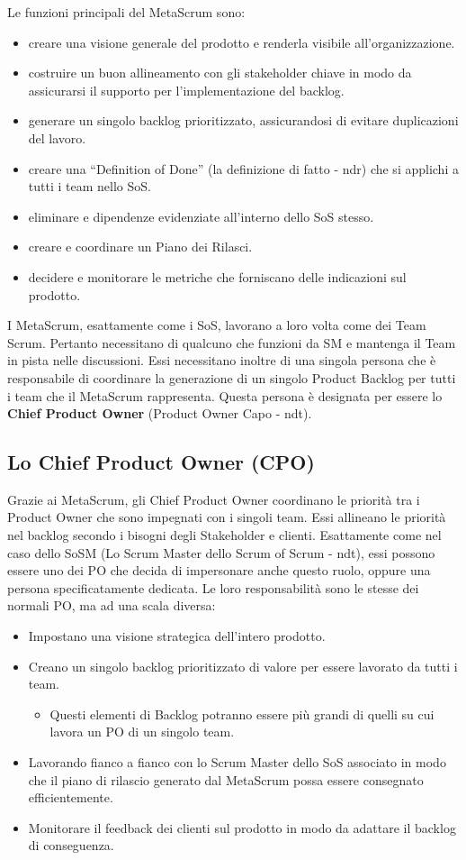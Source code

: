 \documentclass[12pt,a4paper,parskip=full]{scrartcl}
\begin{document}
Le funzioni principali del MetaScrum sono:
\begin{itemize}
\item creare una visione generale del prodotto e renderla visibile all'organizzazione.
\item costruire un buon allineamento con gli stakeholder chiave in modo da assicurarsi il supporto per l'implementazione del backlog.
\item generare un singolo backlog prioritizzato, assicurandosi di evitare duplicazioni del lavoro.
\item creare una ``Definition of Done'' (la definizione di fatto - ndr) che si applichi a tutti i team nello SoS.
\item eliminare e dipendenze evidenziate all'interno dello SoS stesso.
\item creare e coordinare un Piano dei Rilasci.
\item decidere e monitorare le metriche che forniscano delle indicazioni sul prodotto.
\end{itemize}
I MetaScrum, esattamente come i SoS, lavorano a loro volta come dei Team Scrum. Pertanto necessitano di qualcuno che funzioni da SM e mantenga il Team in pista nelle discussioni. Essi necessitano inoltre di una singola persona che è responsabile di coordinare la generazione di un singolo Product Backlog per tutti i team che il MetaScrum rappresenta. Questa persona è designata per essere lo \textbf{Chief Product Owner} (Product Owner Capo - ndt).

\subsection{Lo Chief Product Owner (CPO)}
Grazie ai MetaScrum, gli Chief Product Owner coordinano le priorità tra i Product Owner che sono impegnati con i singoli team. Essi allineano le priorità nel backlog secondo i bisogni degli Stakeholder e clienti. Esattamente come nel caso dello SoSM (Lo Scrum Master dello Scrum of Scrum - ndt), essi possono essere uno dei PO che decida di impersonare anche questo ruolo, oppure una persona specificatamente dedicata. Le loro responsabilità sono le stesse dei normali PO, ma ad una scala diversa: 
\begin{itemize}
\item Impostano una visione strategica dell'intero prodotto.
\item Creano un singolo backlog prioritizzato di valore per essere lavorato da tutti i team.
\begin{itemize}
\item Questi elementi di Backlog potranno essere più grandi di quelli su cui lavora un PO di un singolo team.
\end{itemize}
\item Lavorando fianco a fianco con lo Scrum Master dello SoS associato in modo che il piano di rilascio generato dal MetaScrum possa essere consegnato efficientemente.
\item Monitorare il feedback dei clienti sul prodotto in modo da adattare il backlog di conseguenza.
\end{itemize}
\end{document}
